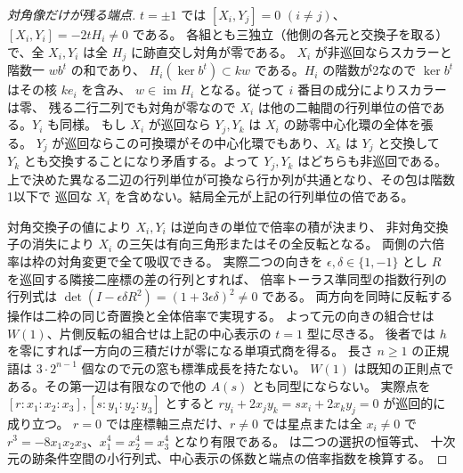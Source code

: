 \begin{proof}[対角像だけが残る端点]
$t=\pm1$ では $[X_i,Y_j]=0$ $(i\ne j)$、$[X_i,Y_i]=-2t H_i\ne0$ である。
各組とも三独立（他側の各元と交換子を取る）で、全 $X_i,Y_i$ は全 $H_j$ に跡直交し対角が零である。
$X_i$ が非巡回ならスカラーと階数一 $w b^t$ の和であり、
$H_i(\ker b^t)\subset kw$ である。$H_i$ の階数が2なので $\ker b^t$ はその核 $ke_i$ を含み、
$w\in\operatorname{im} H_i$ となる。従って $i$ 番目の成分によりスカラーは零、
残る二行二列でも対角が零なので $X_i$ は他の二軸間の行列単位の倍である。$Y_i$ も同様。
もし $X_i$ が巡回なら $Y_j,Y_k$ は $X_i$ の跡零中心化環の全体を張る。
$Y_j$ が巡回ならこの可換環がその中心化環でもあり、$X_k$ は $Y_j$ と交換して
$Y_k$ とも交換することになり矛盾する。よって $Y_j,Y_k$ はどちらも非巡回である。
上で決めた異なる二辺の行列単位が可換なら行か列が共通となり、その包は階数1以下で
巡回な $X_i$ を含めない。結局全元が上記の行列単位の倍である。

対角交換子の値により $X_i,Y_i$ は逆向きの単位で倍率の積が決まり、
非対角交換子の消失により $X_i$ の三矢は有向三角形またはその全反転となる。
両側の六倍率は枠の対角変更で全て吸収できる。
実際二つの向きを $\epsilon,\delta\in\{1,-1\}$ とし $R$ を巡回する隣接二座標の差の行列とすれば、
倍率トーラス準同型の指数行列の行列式は
$\det(I-\epsilon\delta R^2)=(1+3\epsilon\delta)^2\ne0$ である。
両方向を同時に反転する操作は二枠の同じ奇置換と全体倍率で実現する。
よって元の向きの組合せは $W(1)$、片側反転の組合せは上記の中心表示の $t=1$ 型に尽きる。
後者では $h$ を零にすれば一方向の三積だけが零になる単項式商を得る。
長さ $n\ge1$ の正規語は $3\cdot2^{n-1}$ 個なので元の窓も標準成長を持たない。
$W(1)$ は既知の正則点である。その第一辺は有限なので他の $A(s)$ とも同型にならない。
実際点を $[r:x_1:x_2:x_3],[s:y_1:y_2:y_3]$ とすると
$r y_i+2x_j y_k=s x_i+2x_k y_j=0$ が巡回的に成り立つ。
$r=0$ では座標軸三点だけ、$r\ne0$ では星点または全 $x_i\ne0$ で
$r^3=-8x_1x_2x_3$、$x_1^4=x_2^4=x_3^4$ となり有限である。
 は二つの選択の恒等式、
十次元の跡条件空間の小行列式、中心表示の係数と端点の倍率指数を検算する。
\end{proof}

